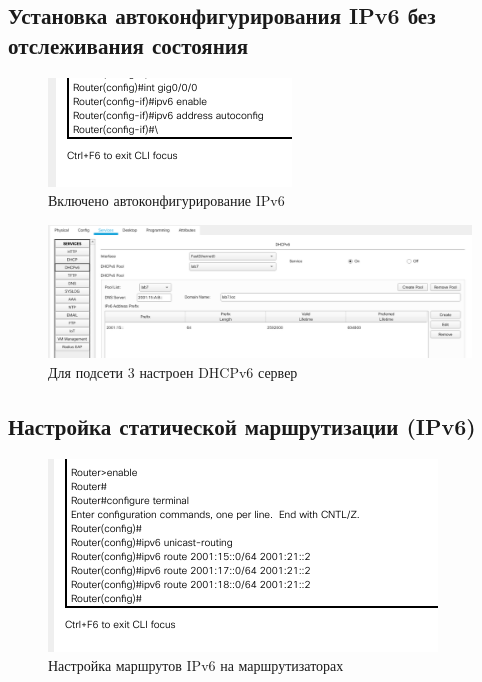 \documentclass[12pt]{report}
\begin{document}
\subsection*{Установка автоконфигурирования IPv6 без отслеживания состояния}

\begin{figure}[H]
	\begin{center}
		\includegraphics[scale=0.8]{img/12.png}
	\end{center}
	\caption{Включено автоконфигурирование IPv6}
	\label{fig:12}
\end{figure}

\begin{figure}[H]
	\begin{center}
		\includegraphics[scale=0.4]{img/13.png}
	\end{center}
	\caption{Для подсети 3 настроен DHCPv6 сервер}
	\label{fig:13}
\end{figure}

\subsection*{Настройка статической маршрутизации (IPv6)}

\begin{figure}[H]
	\begin{center}
		\includegraphics[scale=0.8]{img/14.png}
	\end{center}
	\caption{Настройка маршрутов IPv6 на маршрутизаторах}
	\label{fig:14}
\end{figure}
\end{document}

